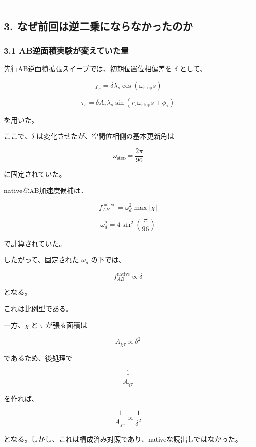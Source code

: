 \documentclass[
  a4paper,
]{ltjsarticle}
\begin{document}
\begin{center}\rule{0.5\linewidth}{0.5pt}\end{center}

\subsection{3.
なぜ前回は逆二乗にならなかったのか}\label{ux306aux305cux524dux56deux306fux9006ux4e8cux4e57ux306bux306aux3089ux306aux304bux3063ux305fux306eux304b}

\subsubsection{3.1
AB逆面積実験が変えていた量}\label{abux9006ux9762ux7a4dux5b9fux9a13ux304cux5909ux3048ux3066ux3044ux305fux91cf}

先行AB逆面積拡張スイープでは、初期位置位相偏差を \(\delta\) として、

\[
\chi_s
=\delta\lambda_s\cos(\omega_{\mathrm{step}}s)
\]

\[
\tau_s
=\delta A_\tau\lambda_s
\sin(r_\tau\omega_{\mathrm{step}}s+\phi_\tau)
\]

を用いた。

ここで、\(\delta\) は変化させたが、空間位相側の基本更新角は

\[
\omega_{\mathrm{step}}
=\frac{2\pi}{96}
\]

に固定されていた。

nativeなAB加速度候補は、

\[
f_{AB}^{\mathrm{native}}
=\omega_d^2\max|\chi|
\]

\[
\omega_d^2
=4\sin^2\left(\frac{\pi}{96}\right)
\]

で計算されていた。

したがって、固定された \(\omega_d\) の下では、

\[
f_{AB}^{\mathrm{native}}\propto\delta
\]

となる。

これは比例型である。

一方、\(\chi\) と \(\tau\) が張る面積は

\[
A_{\chi\tau}\propto\delta^2
\]

であるため、後処理で

\[
\frac{1}{A_{\chi\tau}}
\]

を作れば、

\[
\frac{1}{A_{\chi\tau}}
\propto\frac{1}{\delta^2}
\]

となる。しかし、これは構成済み対照であり、nativeな読出しではなかった。
\end{document}
